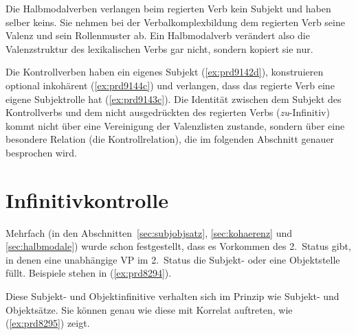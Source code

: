 
Die Halbmodalverben verlangen beim regierten Verb kein Subjekt und haben selber keins.
Sie nehmen bei der Verbalkomplexbildung dem regierten Verb seine Valenz und sein Rollenmuster ab.
Ein Halbmodalverb verändert also die Valenzstruktur des lexikalischen Verbs gar nicht, sondern kopiert sie nur.


Die Kontrollverben haben ein eigenes Subjekt (\ref{ex:prd9142d}), konstruieren optional inkohärent (\ref{ex:prd9144c}) und verlangen, dass das regierte Verb eine eigene Subjektrolle hat (\ref{ex:prd9143c}).
Die Identität zwischen dem Subjekt des Kontrollverbs und dem nicht ausgedrückten des regierten Verbs (\textit{zu}-Infinitiv) kommt nicht über eine Vereinigung der Valenzlisten zustande, sondern über eine besondere Relation (die Kontrollrelation), die im folgenden Abschnitt genauer besprochen wird.

\section{Infinitivkontrolle}

\label{sec:infkonstr}
\label{sec:kontrollinfinitive}


Mehrfach (\zB in den Abschnitten~\ref{sec:subjobjsatz}, \ref{sec:kohaerenz} und \ref{sec:halbmodale}) wurde schon festgestellt, dass es Vorkommen des 2.~Status gibt, in denen eine unabhängige VP im 2.~Status \zB die Subjekt- oder eine Objektstelle füllt.
Beispiele stehen in (\ref{ex:prd8294}).

\begin{exe}
  \ex\label{ex:prd8294} 
  \begin{xlist}
  \end{xlist}
\end{exe}


Diese Subjekt- und Objektinfinitive verhalten sich im Prinzip wie Subjekt- und Objektsätze.
Sie können genau wie diese mit Korrelat auftreten, wie (\ref{ex:prd8295}) zeigt.

\begin{exe}
  \ex\label{ex:prd8295} 
  \begin{xlist}
  \end{xlist}
\end{exe}

